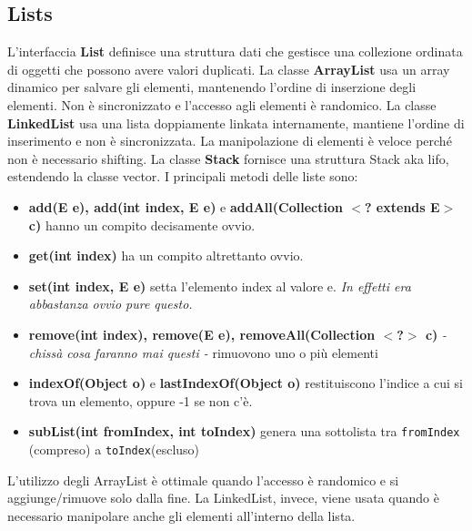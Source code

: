 \documentclass[11pt]{article}
\newcommand{\code}[1]{\texttt{#1}}
\begin{document}
\subsection{Lists}
L'interfaccia \textbf{List} definisce una struttura dati che gestisce una collezione ordinata di oggetti che possono avere valori duplicati. La classe \textbf{ArrayList} usa un array dinamico per salvare gli elementi, mantenendo l'ordine di inserzione degli elementi. Non è sincronizzato e l'accesso agli elementi è randomico. La classe \textbf{LinkedList} usa una lista doppiamente linkata internamente, mantiene l'ordine di inserimento e non è sincronizzata. La manipolazione di elementi è veloce perché non è necessario shifting. La classe \textbf{Stack} fornisce una struttura Stack aka \gls{lifo}, estendendo la classe vector.
I principali metodi delle liste sono:
\begin{itemize}
    \item \textbf{add(E e), add(int index, E e)} e \textbf{addAll(Collection $<$? extends E$>$ c)} hanno un compito decisamente ovvio.
    \item \textbf{get(int index)} ha un compito altrettanto ovvio.
    \item \textbf{set(int index, E e)} setta l'elemento index al valore e. \textit{In effetti era abbastanza ovvio pure questo.}
    \item \textbf{remove(int index), remove(E e), removeAll(Collection $<$?$>$ c)} \textit{- chissà cosa faranno mai questi -} rimuovono uno o più elementi
    \item \textbf{indexOf(Object o)} e \textbf{lastIndexOf(Object o)} restituiscono l'indice a cui si trova un elemento, oppure -1 se non c'è.
    \item \textbf{subList(int fromIndex, int toIndex)} genera una sottolista tra \code{fromIndex} (compreso) a \code{toIndex}(escluso)
 \end{itemize}
 L'utilizzo degli ArrayList è ottimale quando l'accesso è randomico e si aggiunge/rimuove solo dalla fine. La LinkedList, invece, viene usata quando è necessario manipolare anche gli elementi all'interno della lista.
\end{document}
